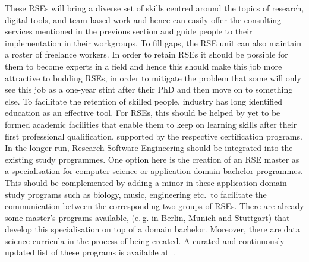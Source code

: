 \documentclass[a4paper]{article}
\makeatletter
\newcommand*{\eg}{e.\,g.\@\xspace}
\makeatother
\begin{document}
These RSEs will bring a diverse set of skills centred around the topics of research,
digital tools, and team-based work and hence can easily offer the consulting services mentioned in the previous section and guide people to their implementation in their workgroups.
To fill gaps, the RSE unit can also maintain a roster of freelance workers.
In order to retain RSEs it should be possible for them to become experts in a field and hence this should make this job more attractive to budding RSEs,
in order to mitigate the problem that some will only see this job as a one-year stint after their PhD and then move on to something else.
To facilitate the retention of skilled people, industry has long identified education as an effective tool.
For RSEs, this should be helped by yet to be formed academic facilities that enable them to keep on learning skills after their first professional qualification, supported by the respective certification programs.
In the longer run, Research Software Engineering should be integrated into the existing study programmes.
One option here is the creation of an RSE master as a specialisation for computer science or application-domain bachelor programmes.
This should be complemented by adding a minor in these application-domain study programs such as biology, music, engineering etc.\ to facilitate the communication between the corresponding two groups of RSEs.
There are already some master's programs available, (\eg{} in Berlin, Munich and Stuttgart) that develop this specialisation on top of a domain bachelor.
Moreover, there are data science curricula in the process of being created.
A curated and continuously updated list of these programs is available at~\cite{learnandteachlearn}.

\printbibliography[heading=bibintoc]
\end{document}

